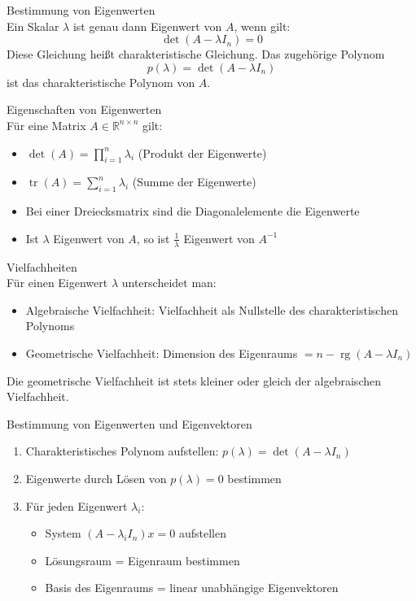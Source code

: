 \begin{concept}{Bestimmung von Eigenwerten}\\
Ein Skalar $\lambda$ ist genau dann Eigenwert von $A$, wenn gilt:
$$\det(A - \lambda I_n) = 0$$
Diese Gleichung heißt charakteristische Gleichung. Das zugehörige Polynom
$$p(\lambda) = \det(A - \lambda I_n)$$
ist das charakteristische Polynom von $A$.
\end{concept}

\begin{theorem}{Eigenschaften von Eigenwerten}\\
Für eine Matrix $A \in \mathbb{R}^{n\times n}$ gilt:
\begin{itemize}
    \item $\det(A) = \prod_{i=1}^n \lambda_i$ (Produkt der Eigenwerte)
    \item $\operatorname{tr}(A) = \sum_{i=1}^n \lambda_i$ (Summe der Eigenwerte)
    \item Bei einer Dreiecksmatrix sind die Diagonalelemente die Eigenwerte
    \item Ist $\lambda$ Eigenwert von $A$, so ist $\frac{1}{\lambda}$ Eigenwert von $A^{-1}$
\end{itemize}
\end{theorem}

\begin{concept}{Vielfachheiten}\\
Für einen Eigenwert $\lambda$ unterscheidet man:
\begin{itemize}
    \item Algebraische Vielfachheit: Vielfachheit als Nullstelle des charakteristischen Polynoms
    \item Geometrische Vielfachheit: Dimension des Eigenraums $= n - \operatorname{rg}(A-\lambda I_n)$
\end{itemize}
Die geometrische Vielfachheit ist stets kleiner oder gleich der algebraischen Vielfachheit.
\end{concept}

\begin{KR}{Bestimmung von Eigenwerten und Eigenvektoren}
\begin{enumerate}
    \item Charakteristisches Polynom aufstellen: $p(\lambda) = \det(A-\lambda I_n)$
    \item Eigenwerte durch Lösen von $p(\lambda) = 0$ bestimmen
    \item Für jeden Eigenwert $\lambda_i$:
        \begin{itemize}
            \item System $(A-\lambda_i I_n)x = 0$ aufstellen
            \item Lösungsraum = Eigenraum bestimmen
            \item Basis des Eigenraums = linear unabhängige Eigenvektoren
        \end{itemize}
\end{enumerate}
\end{KR}

